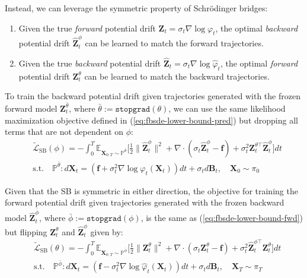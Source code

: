 \documentclass{article}
\begin{document}
Instead, we can leverage the symmetric property of Schrödinger bridges:
\begin{enumerate}
    \item Given the true \textit{forward} potential drift $\boldsymbol{Z}_t=\sigma_t\nabla \log\varphi_t$, the optimal \textit{backward} potential drift $\widehat{\boldsymbol{Z}}_t^\phi$ can be learned to match the forward trajectories. 
    \item Given the true \textit{backward} potential drift $\widehat{\boldsymbol{Z}}_t=\sigma_t\nabla \log\hat{\varphi}_t$, the optimal \textit{forward} potential drift $\boldsymbol{Z}_t^\theta$ can be learned to match the backward trajectories.
\end{enumerate}

To train the backward potential drift given trajectories generated with the frozen forward model $\boldsymbol{Z}^{\bar{\theta}}_t$, where $\bar{\theta}:=\texttt{stopgrad}(\theta)$, we can use the same likelihood maximization objective defined in (\ref{eq:fbsde-lower-bound-pred}) but dropping all terms that are not dependent on $\phi$:
\begin{align}
    &\tilde{\mathcal{L}}_{\text{SB}}(\phi)=-\int_0^T\mathbb{E}_{\boldsymbol{X}_{0:T}\sim \mathbb{P}^{\bar{\theta}}}\bigg[\frac{1}{2}\|\widehat{\boldsymbol{Z}}^\phi_t\|^2+\nabla\cdot (\sigma_t\widehat{\boldsymbol{Z}}^\phi_t-\boldsymbol{f})+ \sigma_t^2\boldsymbol{Z}^{\theta\top}_t \widehat{\boldsymbol{Z}}^\phi_t\bigg]dt\label{eq:fbsde-lower-bound-fwd}\\
    &\text{s.t.}\quad \mathbb{P}^{\bar{\theta}}: d\boldsymbol{X}_t=(\boldsymbol{f}+\sigma_t^2\nabla \log \varphi_t(\boldsymbol{X}_t))dt+\sigma_t d\boldsymbol{B}_t, \quad \boldsymbol{X}_0\sim \pi_0
\end{align}

Given that the SB is symmetric in either direction, the objective for training the forward potential drift given trajectories generated with the frozen backward model $\widehat{\boldsymbol{Z}}^{\bar{\phi}}_t$, where $\bar{\phi}:=\texttt{stopgrad}(\phi)$, is the same as (\ref{eq:fbsde-lower-bound-fwd}) but flipping $\boldsymbol{Z}_t^\theta$ and $\widehat{\boldsymbol{Z}}^\phi_t$ given by:
\begin{align}
    &\tilde{\mathcal{L}}_{\text{SB}}(\theta)=-\int_0^T\mathbb{E}_{\boldsymbol{X}_{0:T}\sim \mathbb{P}^{\bar{\phi}}}\bigg[\frac{1}{2}\|\boldsymbol{Z}^\theta_t\|^2+\nabla\cdot (\sigma_t\boldsymbol{Z}^\theta_t-\boldsymbol{f})+ \sigma_t^2\widehat{\boldsymbol{Z}}^{\phi\top}_t \boldsymbol{Z}^\theta_t\bigg]dt\label{eq:fbsde-lower-bound-bwd}\\
    &\text{s.t.}\quad \mathbb{P}^{\bar{\phi}}: d\boldsymbol{X}_t=(\boldsymbol{f}-\sigma_t^2\nabla \log \hat{\varphi}_t(\boldsymbol{X}_t))dt+\sigma_t d\boldsymbol{B}_t, \quad \boldsymbol{X}_T\sim \pi_T
\end{align}
\end{document}
